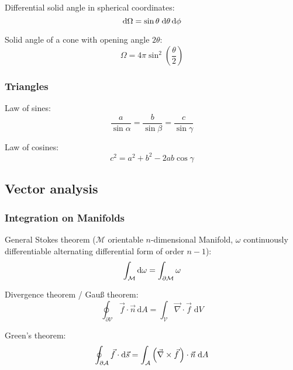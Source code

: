 			\noindent
			Differential solid angle in spherical coordinates:
			\begin{equation}
				\mathrm{d} \Omega = \sin\theta\;\mathrm{d} \theta \,\mathrm{d} \phi
			\end{equation}

			\noindent
			Solid angle of a cone with opening angle $2\theta$:
			\begin{equation}
				\Omega = 4\pi\sin^2\left(\frac{\theta}{2}\right)
			\end{equation}

		\subsubsection{Triangles}
			\noindent
			Law of sines:
			\begin{equation}
				\frac{a}{\sin\alpha} = \frac{b}{\sin\beta} = \frac{c}{\sin\gamma}
			\end{equation}

			\noindent
			Law of cosines:
			\begin{equation}
				c^2 = a^2 + b^2 -2ab \cos\gamma
			\end{equation}


	\subsection{Vector analysis}
		\subsubsection{Integration on Manifolds}
			\noindent
			General Stokes theorem ($\mathcal{M}$ orientable $n$-dimensional Manifold, $\omega$ continuously differentiable alternating differential form of order $n-1$):
			\begin{equation}
				\int_\mathcal{M} \mathrm{d} \omega = \int_{\partial\mathcal{M}} \omega
			\end{equation}

			\noindent
			Divergence theorem / Gauß theorem:
			\begin{equation}
				\oint_{\partial\mathcal{V}}\vec{f}\cdot\vec{n}\,\mathrm{d}A=\int_{\mathcal{V}}\vec{\nabla}\cdot\vec{f}\;\mathrm{d}V
			\end{equation}

			\noindent
			Green's theorem:
			\begin{equation}
				\oint_{\partial\mathcal{A}}\vec{f}\cdot\mathrm{d}\vec{s}=\int_{\mathcal{A}}\left(\vec{\nabla}\times\pvec{f}\right)\cdot\vec{n}\;\mathrm{d}A
			\end{equation}

